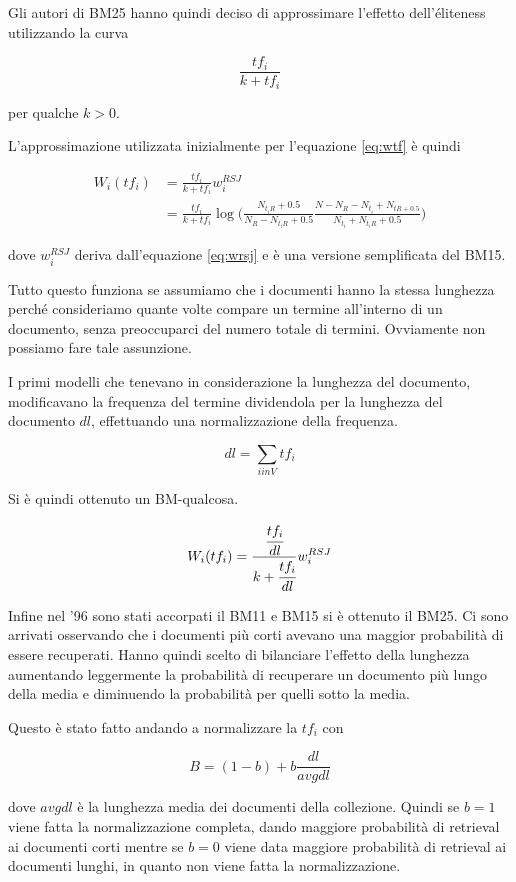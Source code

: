 Gli autori di BM25 hanno quindi deciso di approssimare l'effetto dell'éliteness utilizzando la curva

$$
\frac{tf_i}{k + tf_i}
$$

\noindent per qualche $k > 0$.

L'approssimazione utilizzata inizialmente per l'equazione \ref{eq:wtf} è quindi

\begin{align*}
W_i(tf_i) &= \frac{tf_i}{k + tf_i}  w_i^{RSJ} \\
&=\frac{tf_i}{k + tf_i}  \log \bigg( \frac{N_{t_iR} + 0.5}{N_R - N_{t_iR} + 0.5} \frac{N - N_R - N_{t_i} + N_{tR + 0.5}}{N_{t_i} + N_{t_iR} +0.5} \bigg)
\end{align*}

\noindent dove $w_i^{RSJ}$ deriva dall'equazione \ref{eq:wrsj} e è una versione semplificata del BM15.

Tutto questo funziona se assumiamo che i documenti hanno la stessa lunghezza perché consideriamo quante volte compare un termine all'interno di un documento, senza preoccuparci del numero totale di termini. Ovviamente non possiamo fare tale assunzione.

I primi modelli che tenevano in considerazione la lunghezza del documento, modificavano la frequenza del termine dividendola per la lunghezza del documento $dl$, effettuando una normalizzazione della frequenza.

$$
dl = \sum\limits_{i in V} tf_i
$$

\noindent Si è quindi ottenuto un BM-qualcosa.

$$
W_i(tf_i) = \frac{\cfrac{tf_i}{dl}}{k + \cfrac{tf_i}{dl}}  w_i^{RSJ}
$$

Infine nel '96 sono stati accorpati il BM11 e BM15 si è ottenuto il BM25. Ci sono arrivati osservando che i documenti più corti avevano una maggior probabilità di essere recuperati. 
Hanno quindi scelto di bilanciare l'effetto della lunghezza aumentando leggermente la probabilità di recuperare un documento più lungo della media e diminuendo la probabilità per quelli sotto la media.

Questo è stato fatto andando a normalizzare la $tf_i$ con

$$
B = (1-b)+ b\frac{dl}{avgdl}
$$

\noindent dove $avgdl$ è la lunghezza media dei documenti della collezione.
Quindi se $b=1$ viene fatta la normalizzazione completa, dando maggiore probabilità di retrieval ai documenti corti mentre se $b=0$ viene data maggiore probabilità di retrieval ai documenti lunghi, in quanto non viene fatta la normalizzazione.

